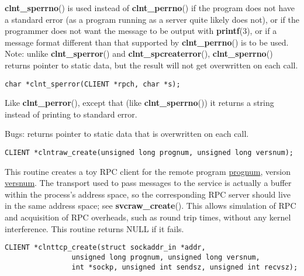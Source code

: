 \documentclass[]{article}
\let\realtextbf=\textbf
\renewcommand{\textbf}[1]{\textcolor{boldcolor}{\realtextbf{#1}}}
\renewcommand{\emph}[1]{\underline{#1}}
\begin{document}
\begin{description}
\itemsep1pt\parskip0pt
\item[]
\textbf{clnt\_sperrno}() is used instead of \textbf{clnt\_perrno}() if
the program does not have a standard error (as a program running as a
server quite likely does not), or if the programmer does not want the
message to be output with \textbf{printf}(3), or if a message format
different than that supported by \textbf{clnt\_perrno}() is to be used.
Note: unlike \textbf{clnt\_sperror}() and \textbf{clnt\_spcreaterror}(),
\textbf{clnt\_sperrno}() returns pointer to static data, but the result
will not get overwritten on each call.
\end{description}

\begin{verbatim}
char *clnt_sperror(CLIENT *rpch, char *s);
\end{verbatim}

\begin{description}
\itemsep1pt\parskip0pt
\item[]
Like \textbf{clnt\_perror}(), except that (like
\textbf{clnt\_sperrno}()) it returns a string instead of printing to
standard error.
\end{description}

\begin{description}
\itemsep1pt\parskip0pt
\item[]
Bugs: returns pointer to static data that is overwritten on each call.
\end{description}

\begin{verbatim}
CLIENT *clntraw_create(unsigned long prognum, unsigned long versnum);
\end{verbatim}

\begin{description}
\itemsep1pt\parskip0pt
\item[]
This routine creates a toy RPC client for the remote program
\emph{prognum}, version \emph{versnum}. The transport used to pass
messages to the service is actually a buffer within the process's
address space, so the corresponding RPC server should live in the same
address space; see \textbf{svcraw\_create}(). This allows simulation of
RPC and acquisition of RPC overheads, such as round trip times, without
any kernel interference. This routine returns NULL if it fails.
\end{description}

\begin{verbatim}
CLIENT *clnttcp_create(struct sockaddr_in *addr,
                unsigned long prognum, unsigned long versnum,
                int *sockp, unsigned int sendsz, unsigned int recvsz);
\end{verbatim}
\end{document}
